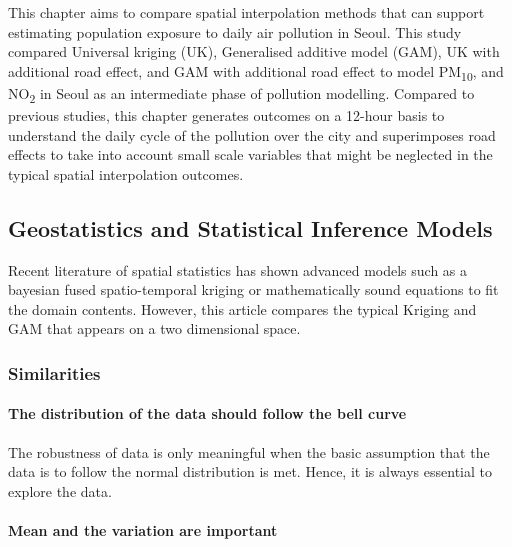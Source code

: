 This chapter aims to compare spatial interpolation methods that can
support estimating population exposure to daily air pollution in Seoul.
This study compared Universal kriging (UK), Generalised additive model
(GAM), UK with additional road effect, and GAM with additional road
effect to model PM\textsubscript{10}, and NO\textsubscript{2} in Seoul
as an intermediate phase of pollution modelling. Compared to previous
studies, this chapter generates outcomes on a 12-hour basis to
understand the daily cycle of the pollution over the city and
superimposes road effects to take into account small scale variables
that might be neglected in the typical spatial interpolation outcomes.

\hypertarget{geostatistics-and-statistical-inference-models}{%
\subsection{Geostatistics and Statistical Inference
Models}\label{geostatistics-and-statistical-inference-models}}

Recent literature of spatial statistics has shown advanced models such
as a bayesian fused spatio-temporal kriging or mathematically sound
equations to fit the domain contents. However, this article compares the
typical Kriging and GAM that appears on a two dimensional space.

\hypertarget{similarities}{%
\subsubsection{Similarities}\label{similarities}}

\hypertarget{the-distribution-of-the-data-should-follow-the-bell-curve}{%
\paragraph{The distribution of the data should follow the bell
curve}\label{the-distribution-of-the-data-should-follow-the-bell-curve}}

The robustness of data is only meaningful when the basic assumption that
the data is to follow the normal distribution is met. Hence, it is
always essential to explore the data.

\hypertarget{mean-and-the-variation-are-important}{%
\paragraph{Mean and the variation are
important}\label{mean-and-the-variation-are-important}}

